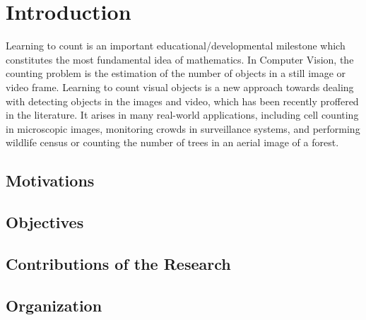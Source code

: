 \chapter{Introduction}
\label{sec:introduction}




Learning to count is an important  educational/developmental milestone  which constitutes the most fundamental idea of mathematics. In Computer Vision, the counting problem is the estimation of the number of objects in a still image or video frame. Learning to count visual objects is a new approach towards dealing with detecting objects in the images and video, which has been recently  proffered in the literature. It arises in many real-world applications, including cell counting in microscopic images, monitoring crowds in surveillance systems, and performing wildlife census or counting the number of trees in an aerial image of a forest\cite{NIPS2010_4043}. 

\section{Motivations}
\section{Objectives}
\section{Contributions of the Research}
\section{Organization}










